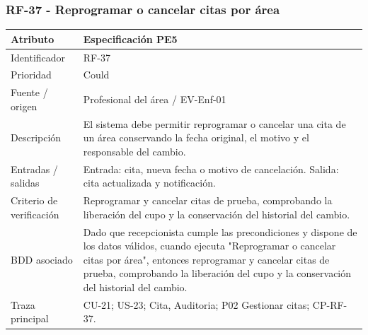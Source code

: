 \documentclass[11pt,a4paper]{article}
\begin{document}
	\subsubsection{RF-37 - Reprogramar o cancelar citas por área}
	\begin{tabularx}{\textwidth}{p{3.2cm}Y}
		\toprule
		\textbf{Atributo} & \textbf{Especificación PE5}\\\midrule
		Identificador & RF-37\\
		Prioridad & Could\\
		Fuente / origen & Profesional del área / EV-Enf-01\\
		Descripción & El sistema debe permitir reprogramar o cancelar una cita de un área conservando la fecha original, el motivo y el responsable del cambio.\\
		Entradas / salidas & Entrada: cita, nueva fecha o motivo de cancelación. Salida: cita actualizada y notificación.\\
		Criterio de verificación & Reprogramar y cancelar citas de prueba, comprobando la liberación del cupo y la conservación del historial del cambio.\\
		BDD asociado & Dado que recepcionista cumple las precondiciones y dispone de los datos válidos, cuando ejecuta "Reprogramar o cancelar citas por área", entonces reprogramar y cancelar citas de prueba, comprobando la liberación del cupo y la conservación del historial del cambio.\\
		Traza principal & CU-21; US-23; Cita, Auditoria; P02 Gestionar citas; CP-RF-37.\\
		\bottomrule
	\end{tabularx}
\end{document}
